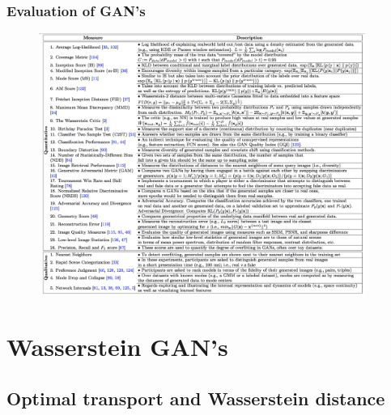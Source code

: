 \documentclass[french,9pt]{beamer}
\begin{document}
\begin{frame}
\frametitle{Evaluation of GAN's \cite{DBLP:journals/corr/abs-1802-03446}}

\begin{figure}
  \begin{center}
    \includegraphics[width=0.95\textwidth]{fig/evaluation_gan.png}
  \end{center}
\end{figure}
\end{frame}



\section{Wasserstein GAN's}

\subsection{Optimal transport and Wasserstein distance}
\end{document}

